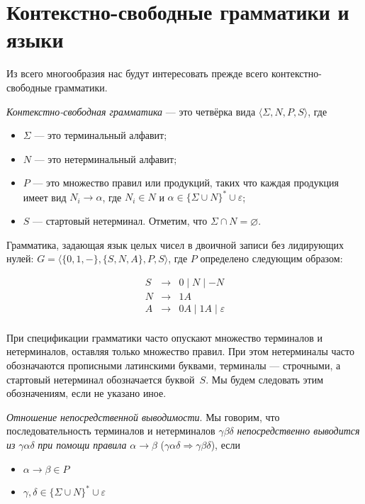 \chapter{Контекстно-свободные грамматики и языки}\label{CFG}

Из всего многообразия нас будут интересовать прежде всего контекстно-свободные грамматики.

\begin{definition}
\textit{Контекстно-свободная грамматика} --- это четвёрка вида $\langle \Sigma, N, P, S \rangle$, где
\begin{itemize}
  \item $\Sigma$ --- это терминальный алфавит;
  \item $N$ --- это нетерминальный алфавит;
  \item $P$ --- это множество правил или продукций, таких что каждая продукция имеет вид $N_i \to \alpha$, где $N_i \in N$ и $\alpha \in \{\Sigma \cup N\}^* \cup {\varepsilon}$;
  \item $S$ --- стартовый нетерминал.
  Отметим, что $\Sigma \cap N = \varnothing$.
\end{itemize}
\end{definition}

\begin{example}
Грамматика, задающая язык целых чисел в двоичной записи без лидирующих нулей: $G = \langle \{0, 1, -\}, \{S, N, A\}, P, S \rangle$, где $P$ определено следующим образом:

\[
\begin{array}{rcl}
S& \rightarrow & 0 \mid N \mid - N  \\
N& \rightarrow & 1 A \\
A& \rightarrow & 0 A \mid 1 A  \mid \varepsilon\\
\end{array}
\]
\end{example}

При спецификации грамматики часто опускают множество терминалов и нетерминалов, оставляя только множество правил. При этом нетерминалы часто обозначаются прописными латинскими буквами, терминалы --- строчными, а стартовый нетерминал обозначается буквой~$S$. Мы будем следовать этим обозначениям, если не указано иное.


\begin{definition}\label{def derivability in CFG}
  \textit{Отношение непосредственной выводимости}. Мы говорим, что последовательность терминалов и нетерминалов $\gamma \beta \delta$ \textit{непосредственно выводится из} $\gamma \alpha \delta$ \textit{при помощи правила} $\alpha \rightarrow \beta$ ($\gamma \alpha \delta \Rightarrow \gamma \beta \delta$), если
  \begin{itemize}
    \item $\alpha \rightarrow \beta \in P$
    \item $\gamma, \delta \in \{\Sigma \cup N\}^* \cup {\varepsilon}$
  \end{itemize}
\end{definition}

